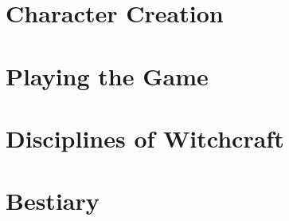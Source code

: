 

\part{Character Creation}










\part{Playing the Game}



\part{Disciplines of Witchcraft}




























\part{Bestiary}




